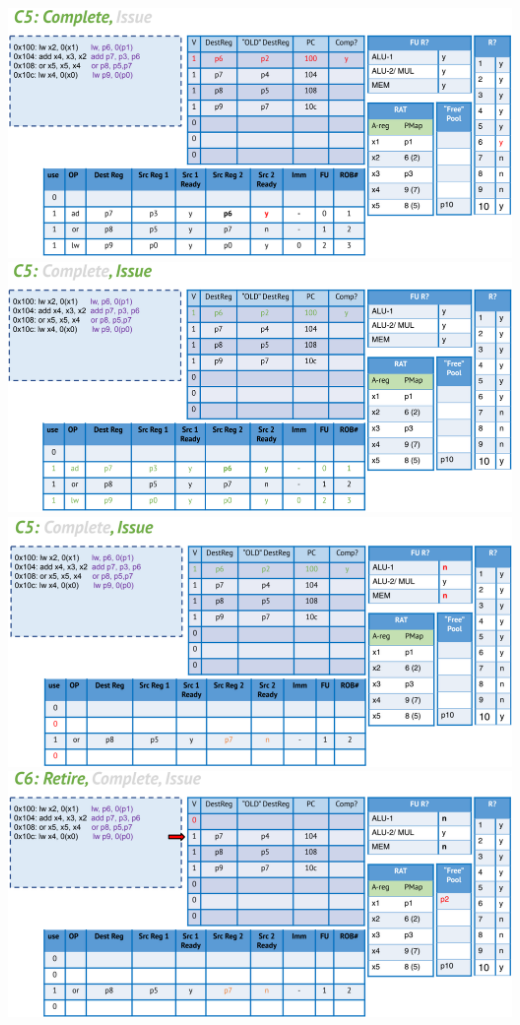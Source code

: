 \documentclass[10pt]{article}
\begin{document}
\begin{center}
\includegraphics*[width=\textwidth]{W5_out_of_order/12.png}\\
\includegraphics*[width=\textwidth]{W5_out_of_order/13.png}\\
\includegraphics*[width=\textwidth]{W5_out_of_order/14.png}\\
\includegraphics*[width=\textwidth]{W5_out_of_order/15.png}\\

\end{center}
\end{document}
